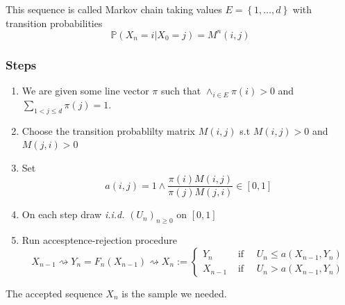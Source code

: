 	This sequence is called Markov chain taking values $E = \left\{1, \ldots, d\right\}$ with transition probabilities
	\begin{equation}
		\mathbb{P}\left(X_n = i \vert X_0 = j\right) =  M^n(i,j)
	\end{equation}
	\subsubsection{Steps}
	\begin{enumerate}
		\item We are given some line vector $\pi$ such that $\wedge_{i\in E} \pi(i) > 0$ and  $\sum_{ 1 < j \le d} \pi(j) = 1$. \\
		\item Choose the transition probablilty matrix $M(i,j)$ s.t $M(i,j) > 0$ and $M(j,i) > 0$ \\
		
		\item Set
		\begin{equation}
			a(i,j) = 1 \wedge \frac{\pi(i)M(i,j)}{\pi(j)M(j,i)} \in \left[0,1\right]
		\end{equation}
	
		\item On each step draw \textit{i.i.d.} $\left(U_n\right)_{n\ge 0}$ on $\left[0,1\right]$
		
		\item Run accesptence-rejection procedure
		 \begin{equation}
			X_{n-1} \rightsquigarrow Y_{n}=F_{n}\left(X_{n-1}\right) \rightsquigarrow X_{n}:=\left\{\begin{aligned}
				Y_{n} & \text { if } \quad U_{n} \leq a\left(X_{n-1}, Y_{n}\right) \\
				X_{n-1} & \text { if } \quad U_{n}>a\left(X_{n-1}, Y_{n}\right)
			\end{aligned}\right.
		\end{equation}
	\end{enumerate}
	
	The accepted sequence $X_n$ is the sample we needed.
	

	

	
	